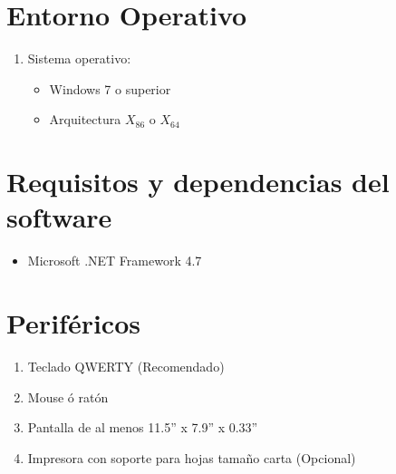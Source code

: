 \documentclass[a4paper,DIV=12]{scrreprt}
\begin{document}


\setcounter{section}{0}
\setcounter{subsection}{-1}
\section{Entorno Operativo}

\begin{enumerate}
	\item{Sistema operativo:}
		\begin{itemize}
			\item{Windows 7 o superior}	
			\item{Arquitectura $X_{86}$ o $X_{64}$}
		\end{itemize}
\end{enumerate}



\section{Requisitos y dependencias del software}

		\begin{itemize}
			\item{Microsoft .NET Framework 4.7 }	
		\end{itemize}	

\section{Periféricos}
\begin{enumerate}
	\item{Teclado QWERTY (Recomendado)}
	\item{Mouse ó ratón}
	\item{Pantalla de al menos 11.5” x 7.9” x 0.33”}
	\item{Impresora con soporte para hojas tamaño carta (Opcional)}
\end{enumerate}
\end{document}
